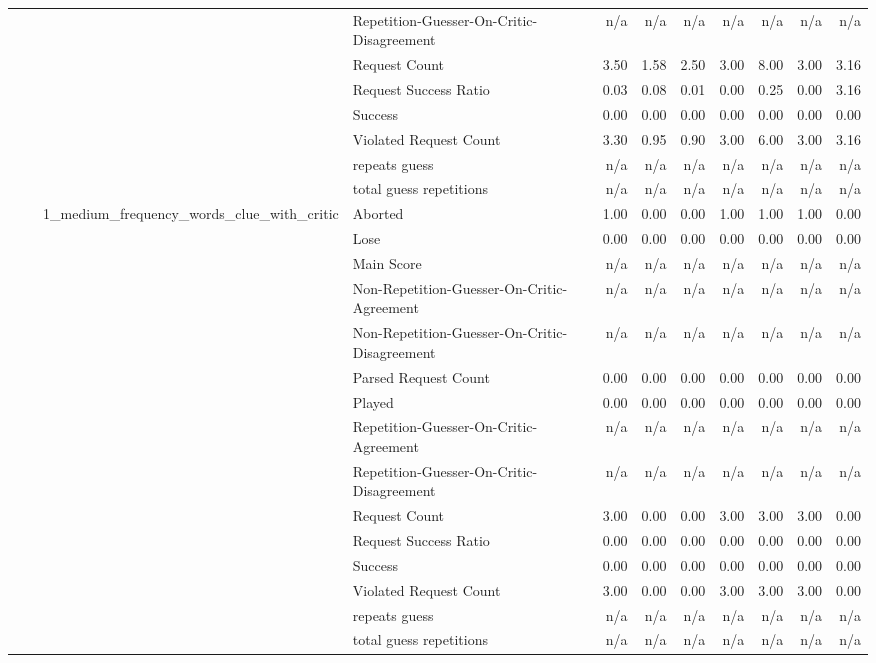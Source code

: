 \begin{tabular}{llllrrrrrrr}
 &  &  & Repetition-Guesser-On-Critic-Disagreement & n/a & n/a & n/a & n/a & n/a & n/a & n/a \\
 &  &  & Request Count & 3.50 & 1.58 & 2.50 & 3.00 & 8.00 & 3.00 & 3.16 \\
 &  &  & Request Success Ratio & 0.03 & 0.08 & 0.01 & 0.00 & 0.25 & 0.00 & 3.16 \\
 &  &  & Success & 0.00 & 0.00 & 0.00 & 0.00 & 0.00 & 0.00 & 0.00 \\
 &  &  & Violated Request Count & 3.30 & 0.95 & 0.90 & 3.00 & 6.00 & 3.00 & 3.16 \\
 &  &  & repeats guess & n/a & n/a & n/a & n/a & n/a & n/a & n/a \\
 &  &  & total guess repetitions & n/a & n/a & n/a & n/a & n/a & n/a & n/a \\
\cline{3-11}
 &  & \multirow[t]{15}{*}{1_medium_frequency_words_clue_with_critic} & Aborted & 1.00 & 0.00 & 0.00 & 1.00 & 1.00 & 1.00 & 0.00 \\
 &  &  & Lose & 0.00 & 0.00 & 0.00 & 0.00 & 0.00 & 0.00 & 0.00 \\
 &  &  & Main Score & n/a & n/a & n/a & n/a & n/a & n/a & n/a \\
 &  &  & Non-Repetition-Guesser-On-Critic-Agreement & n/a & n/a & n/a & n/a & n/a & n/a & n/a \\
 &  &  & Non-Repetition-Guesser-On-Critic-Disagreement & n/a & n/a & n/a & n/a & n/a & n/a & n/a \\
 &  &  & Parsed Request Count & 0.00 & 0.00 & 0.00 & 0.00 & 0.00 & 0.00 & 0.00 \\
 &  &  & Played & 0.00 & 0.00 & 0.00 & 0.00 & 0.00 & 0.00 & 0.00 \\
 &  &  & Repetition-Guesser-On-Critic-Agreement & n/a & n/a & n/a & n/a & n/a & n/a & n/a \\
 &  &  & Repetition-Guesser-On-Critic-Disagreement & n/a & n/a & n/a & n/a & n/a & n/a & n/a \\
 &  &  & Request Count & 3.00 & 0.00 & 0.00 & 3.00 & 3.00 & 3.00 & 0.00 \\
 &  &  & Request Success Ratio & 0.00 & 0.00 & 0.00 & 0.00 & 0.00 & 0.00 & 0.00 \\
 &  &  & Success & 0.00 & 0.00 & 0.00 & 0.00 & 0.00 & 0.00 & 0.00 \\
 &  &  & Violated Request Count & 3.00 & 0.00 & 0.00 & 3.00 & 3.00 & 3.00 & 0.00 \\
 &  &  & repeats guess & n/a & n/a & n/a & n/a & n/a & n/a & n/a \\
 &  &  & total guess repetitions & n/a & n/a & n/a & n/a & n/a & n/a & n/a \\

\end{tabular}
